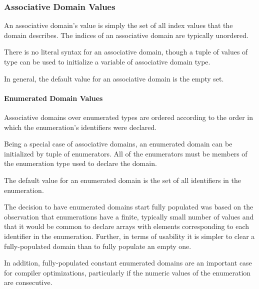\subsubsection{Associative Domain Values}
\label{Associative_Domain_Values}

An associative domain's value is simply the set of all index values
that the domain describes.  The indices of an associative domain are
typically unordered.  


There is no literal syntax for an associative domain, though a tuple
of values of type  can be used to initialize a variable
of associative domain type.



In general, the default value for an associative domain is the empty set.

\paragraph{Enumerated Domain Values}

Associative domains over
enumerated types are ordered according to the order in which the
enumeration's identifiers were declared.

Being a special case of associative domains, an enumerated domain can be
initialized by tuple of enumerators.  All of the enumerators must be
members of the enumeration type used to declare the domain.


The default value for an enumerated domain is the set of all identifiers in the
enumeration.

\begin{rationale}
The decision to have enumerated domains start fully populated was
based on the observation that enumerations have a finite, typically
small number of values and that it would be common to declare arrays
with elements corresponding to each identifier in the enumeration.
Further, in terms of usability it is simpler to clear a fully-populated
domain than to fully populate an empty one.

In addition, fully-populated constant enumerated
domains are an important case for compiler optimizations, particularly
if the numeric values of the enumeration are consecutive.
\end{rationale}

